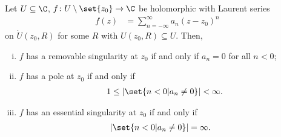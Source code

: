 \documentclass[10pt]{mypackage}
\begin{document}
\begin{theorem}
  Let $U\subseteq \C$, $f\colon U\setminus \set{z_0}\rightarrow \C$ be holomorphic with Laurent series
  \begin{align*}
    f(z) &= \sum_{n=-\infty}^{\infty}a_n\left( z-z_0 \right)^{n}
  \end{align*}
  on $\dot{U}\left( z_0,R \right)$ for some $R$ with $U\left( z_0,R \right)\subseteq U$. Then,
  \begin{enumerate}[(i)]
    \item $f$ has a removable singularity at $z_0$ if and only if $a_n = 0$ for all $n < 0$;
    \item $f$ has a pole at $z_0$ if and only if 
      \begin{align*}
        1 \leq \left\vert \set{n < 0 | a_n\neq 0} \right\vert <\infty.
      \end{align*}
    \item $f$ has an essential singularity at $z_0$ if and only if
      \begin{align*}
        \left\vert \set{n < 0 | a_n\neq 0} \right\vert &= \infty.
      \end{align*}
  \end{enumerate}
\end{theorem}
\end{document}
